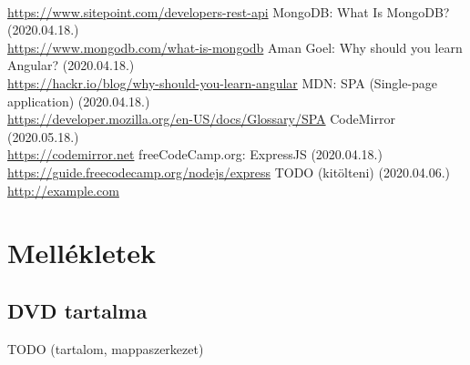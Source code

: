 \documentclass{elteikthesis}
\begin{document}
\begin{thebibliography}{99}
			\\\url{https://www.sitepoint.com/developers-rest-api}
			MongoDB: What Is MongoDB? (2020.04.18.)
			\\\url{https://www.mongodb.com/what-is-mongodb}
			Aman Goel: Why should you learn Angular? (2020.04.18.)
			\\\url{https://hackr.io/blog/why-should-you-learn-angular}
			MDN: SPA (Single-page application) (2020.04.18.)
			\\\url{https://developer.mozilla.org/en-US/docs/Glossary/SPA}
			CodeMirror (2020.05.18.)
			\\\url{https://codemirror.net}
			freeCodeCamp.org: ExpressJS (2020.04.18.)
			\\\url{https://guide.freecodecamp.org/nodejs/express}
			TODO (kitölteni) (2020.04.06.)
			\\\url{http://example.com}

	\end{thebibliography}
	
	\chapter*{Mellékletek}


	\section*{DVD tartalma}
	TODO (tartalom, mappaszerkezet)
\end{document}
